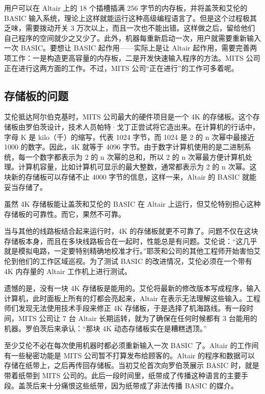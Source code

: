 \documentclass[12pt,UTF8]{ctexbook}
\begin{document}
用户可以在 Altair 上的 18 个插槽插满 256 字节的内存板，并将盖茨和艾伦的 BASIC 输入系统，理论上这样就能运行这种高级编程语言了。但是这个过程极其乏味，需要拨动开关 3 万次以上，而且一次也不能出错。这样做之后，留给他们自己程序的空间就少之又少了。此外，机器每重新启动一次，用户就需要重新输入一次 BASIC。要想让 BASIC 起作用——实际上是让 Altair 起作用，需要完善两项工作：一是构造更高容量的内存板，二是开发快速输入程序的方法。MITS 公司正在进行这两方面的工作。不过，MITS 公司“正在进行”的工作可多着呢。





\subsection{存储板的问题}


艾伦抵达阿尔伯克基时，MITS 公司最大的硬件项目是一个 4K 的存储板。这个存储板由罗伯茨设计，技术人员帕特·戈丁正尝试将它造出来。在计算机的行话中，字母 K 是 kilo（千）的缩写，代表 1024 字节，而 1024 是 2 的 n 次幂中最接近 1000 的数字。因此，4K 就等于 4096 字节。由于数字计算机使用的是二进制系统，每一个数字都表示为 2 的 n 次幂的总和，所以 2 的 n 次幂最方便计算机处理。计算机容量，比如计算机可显示的最大整数，通常都表示为 2 的 n 次幂。这块新的存储板可以存储不止 4000 字节的信息，这样一来，Altair 的 BASIC 就能妥当存储了。

虽然 4K 存储板能让盖茨和艾伦的 BASIC 在 Altair 上运行，但艾伦特别担心这种存储板的可靠性。而它，果然不可靠。

当与其他的线路板结合起来运行时，4K 的存储板就更不可靠了。问题不仅在这块存储板本身，而且在多块线路板合在一起时，性能总是有问题。艾伦说：“这几乎就是模拟电路，一定要特别精确地校准才行。”耶茨和公司的其他工程师开始害怕艾伦到他们的工作区域巡视。为了测试 BASIC 的改进情况，艾伦必须在一个带有 4K 内存量的 Altair 工作机上进行测试。

遗憾的是，没有一块 4K 存储板是能用的。艾伦将最新的修改版本写成程序，输入计算机，此时面板上所有的灯都会亮起来，Altair 在表示无法理解这些输入。工程师们发现无法使用技术手段来修正 4K 存储板，于是选择了机海路线。有一段时间，MITS 公司让 7 台 Altair 长期运转，就为了确保在任何时候都有 3 台能用的机器。罗伯茨后来承认：“那块 4K 动态存储板实在是糟糕透顶。”

至少艾伦不必在每次使用机器时都必须重新输入一次 BASIC 了。Altair 的工作间有一些秘密功能是 MITS 公司暂不打算发布给顾客的。Altair 的程序和数据可以存储在纸带上，之后再传回存储板。当初艾伦首次向罗伯茨展示 BASIC 时，就是带着纸带到 MITS 公司的。此后一段时间里，纸带成了传播这种语言的主要手段。盖茨后来十分痛恨这些纸带，因为纸带成了非法传播 BASIC 的媒介。
\end{document}
